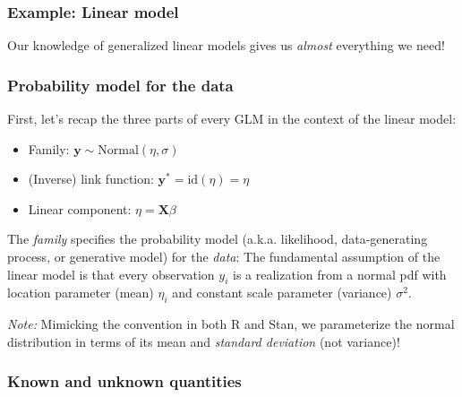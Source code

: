\documentclass[
  11pt,
]{article}
\providecommand{\tightlist}{%
  \setlength{\itemsep}{0pt}\setlength{\parskip}{0pt}}
\begin{document}
\hypertarget{example-linear-model}{%
\subsubsection{Example: Linear model}\label{example-linear-model}}

Our knowledge of generalized linear models gives us \emph{almost} everything we need!

\hypertarget{probability-model-for-the-data}{%
\subsubsection{Probability model for the data}\label{probability-model-for-the-data}}

First, let's recap the three parts of every GLM in the context of the linear model:

\begin{itemize}
\tightlist
\item
  Family: \(\mathbf{y} \sim \text{Normal}(\eta, \sigma)\)
\item
  (Inverse) link function: \(\mathbf{y^{\ast}} = \text{id}(\eta) = \eta\)
\item
  Linear component: \(\eta = \mathbf{X} \beta\)
\end{itemize}

The \emph{family} specifies the probability model (a.k.a. likelihood, data-generating process, or generative model) for the \emph{data}: The fundamental assumption of the linear model is that every observation \(y_i\) is a realization from a normal pdf with location parameter (mean) \(\eta_i\) and constant scale parameter (variance) \(\sigma^2\).

\emph{Note:} Mimicking the convention in both R and Stan, we parameterize the normal distribution in terms of its mean and \emph{standard deviation} (not variance)!

\hypertarget{known-and-unknown-quantities}{%
\subsubsection{Known and unknown quantities}\label{known-and-unknown-quantities}}
\end{document}
